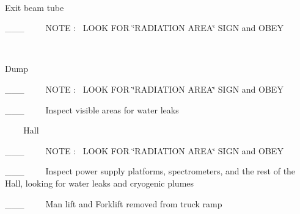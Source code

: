 ~

Exit beam tube

\_\_\_~~~~~NOTE :~ LOOK FOR \char`\"{}RADIATION AREA\char`\"{} SIGN and OBEY

~

Dump

\_\_\_~~~~~NOTE :~ LOOK FOR \char`\"{}RADIATION AREA\char`\"{} SIGN and OBEY

\_\_\_~~~~~Inspect visible areas for water leaks

~
~
~Hall 

\_\_\_~~~~~NOTE :~ LOOK FOR \char`\"{}RADIATION AREA\char`\"{} SIGN and OBEY

\_\_\_~~~~~Inspect power supply platforms, spectrometers, and the rest of the
Hall, looking for water leaks and cryogenic plumes

\_\_\_~~~~~Man lift and Forklift removed from truck ramp

